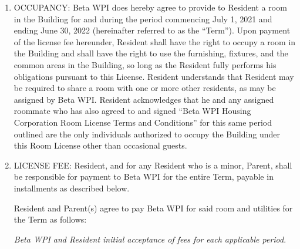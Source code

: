 \documentclass[legalpaper, 12pt]{article}
\begin{document}
\begin{enumerate} 

        
\item\label{itm:occupancy}

OCCUPANCY\@: Beta WPI does hereby agree to provide to Resident a room in the Building for and during the period commencing July 1, 2021 and ending June 30, 2022 (hereinafter referred to as the “Term”).
Upon payment of the license fee hereunder, Resident shall have the right to occupy a room in the Building and shall have the right to use the furnishing, fixtures, and the common areas in the Building, so long as the Resident fully performs his obligations pursuant to this License.
Resident understands that Resident may be required to share a room with one or more other residents, as may be assigned by Beta WPI\@.
Resident acknowledges that he and any assigned roommate who has also agreed to and signed “Beta WPI Housing Corporation Room License Terms and Conditions” for this same period outlined are the only individuals authorized to occupy the Building under this Room License other than occasional guests.

\item\label{itm:licensefee}

LICENSE FEE\@: Resident, and for any Resident who is a minor, Parent, shall be responsible for payment to Beta WPI for the entire Term, payable in installments as described below.

Resident and Parent(s) agree to pay Beta WPI for said room and utilities for the Term as follows:

\textit{Beta WPI and Resident initial acceptance of fees for each applicable period}.


\end{enumerate}
\end{document}
